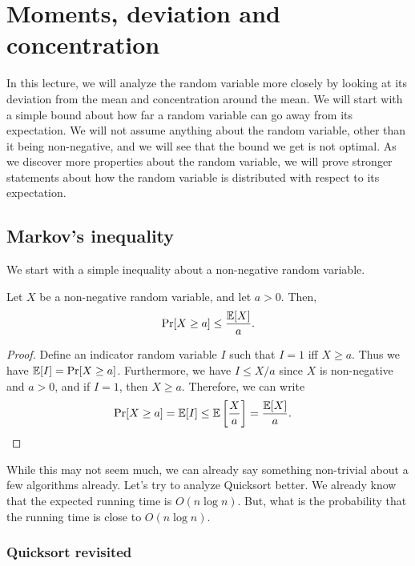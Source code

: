 \chapter{Moments, deviation and concentration}

In this lecture, we will analyze the random variable more closely by looking at its deviation from the mean and concentration around the mean. We will start with a simple bound about how far a random variable can go away from its expectation. We will not assume anything about the random variable, other than it being non-negative, and we will see that the bound we get is not optimal. As we discover more properties about the random variable, we will prove stronger statements about how the random variable is distributed with respect to its expectation.

\section{Markov's inequality}

We start with a simple inequality about a non-negative  random variable.
\begin{theorem}
	Let $X$ be a non-negative random variable, and let $a > 0$. Then,
	\begin{align*}
		\Pr[X \geq a] \leq \frac{\mathbb{E}[X]}{a}.
	\end{align*}
	\label{thm:markov}
\end{theorem}
\begin{proof}
	Define an indicator random variable $I$ such that $I=1$ iff $X \geq a$. Thus we have $\mathbb{E}[I] = \Pr[X \geq a]$. Furthermore, we have $I\leq X/a$ since $X$ is non-negative and $a>0$, and if $I=1$, then $X \geq a$. Therefore, we can write
	\begin{align*}
		\Pr[X \geq a] &= \mathbb{E}[I] \leq \mathbb{E}\left[\frac{X}{a}\right] = \frac{\mathbb{E}[X]}{a}.
	\end{align*}
\end{proof}

While this may not seem much, we can already say something non-trivial about a few algorithms already. Let's try to analyze Quicksort better. We already know that the expected running time is $O(n\log n)$. But, what is the probability that the running time is close to $O(n\log n)$. 

\subsection{Quicksort revisited}

